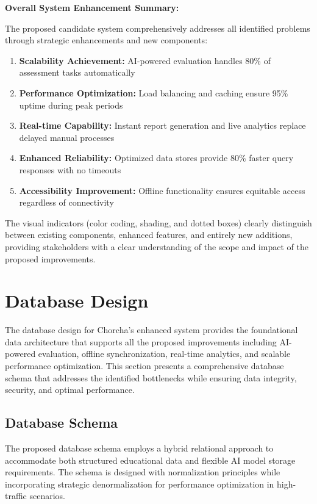 \documentclass[12pt,a4paper,oneside]{book}
\begin{document}
\textbf{Overall System Enhancement Summary:}

The proposed candidate system comprehensively addresses all identified problems through strategic enhancements and new components:

\begin{enumerate}
    \item \textbf{Scalability Achievement:} AI-powered evaluation handles 80\% of assessment tasks automatically
    \item \textbf{Performance Optimization:} Load balancing and caching ensure 95\% uptime during peak periods
    \item \textbf{Real-time Capability:} Instant report generation and live analytics replace delayed manual processes
    \item \textbf{Enhanced Reliability:} Optimized data stores provide 80\% faster query responses with no timeouts
    \item \textbf{Accessibility Improvement:} Offline functionality ensures equitable access regardless of connectivity
\end{enumerate}

The visual indicators (color coding, shading, and dotted boxes) clearly distinguish between existing components, enhanced features, and entirely new additions, providing stakeholders with a clear understanding of the scope and impact of the proposed improvements.

\section{Database Design}

The database design for Chorcha's enhanced system provides the foundational data architecture that supports all the proposed improvements including AI-powered evaluation, offline synchronization, real-time analytics, and scalable performance optimization. This section presents a comprehensive database schema that addresses the identified bottlenecks while ensuring data integrity, security, and optimal performance.

\subsection{Database Schema}

The proposed database schema employs a hybrid relational approach to accommodate both structured educational data and flexible AI model storage requirements. The schema is designed with normalization principles while incorporating strategic denormalization for performance optimization in high-traffic scenarios.
\end{document}
